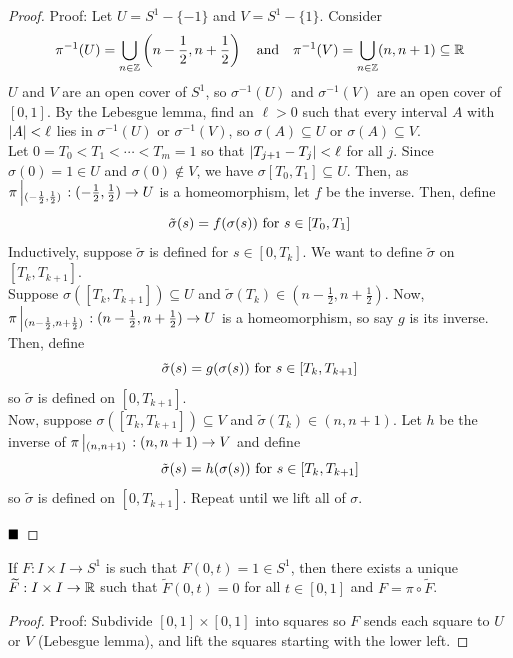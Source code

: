 \begin{proof}{Proof:}
    Let $U = S^1 - \{-1\}$ and $V = S^1 - \{1\}$. Consider
    \[ \pi^{-1}(U) = \bigcup_{n \in \Z} \left(n - \frac{1}{2}, n + \frac{1}{2}\right) \quand \pi^{-1}(V) = \bigcup_{n \in \Z} (n, n + 1) \subseteq \R \]
    $U$ and $V$ are an open cover of $S^1$, so $\sigma^{-1}(U)$ and $\sigma^{-1}(V)$ are an open cover of $[0, 1]$. By the Lebesgue lemma, find an $\ell > 0$ such that every interval $A$ with $\abs{A} < \ell$ lies in $\sigma^{-1}(U)$ or $\sigma^{-1}(V)$, so $\sigma(A) \subseteq U$ or $\sigma(A) \subseteq V$.\\

    Let $0 = T_0 < T_1 < \cdots < T_m = 1$ so that $\abs{T_{j + 1} - T_j} < \ell$ for all $j$. Since $\sigma(0) = 1 \in U$ and $\sigma(0) \notin V$, we have $\sigma[T_0, T_1] \subseteq U$. Then, as $\pi\res{(-\frac{1}{2}, \frac{1}{2})} : (-\frac{1}{2}, \frac{1}{2}) \to U$ is a homeomorphism, let $f$ be the inverse. Then, define
    \[ \tilde{\sigma}(s) = f(\sigma(s)) \tt{ for } s \in [T_0, T_1] \]
    Inductively, suppose $\tilde{\sigma}$ is defined for $s \in [0, T_k]$. We want to define $\tilde{\sigma}$ on $[T_k, T_{k + 1}]$.\\

    Suppose $\sigma([T_k, T_{k + 1}]) \subseteq U$ and $\tilde{\sigma}(T_k) \in (n - \frac{1}{2}, n + \frac{1}{2})$. Now, $\pi\res{(n - \frac{1}{2}, n + \frac{1}{2})} : (n - \frac{1}{2}, n + \frac{1}{2}) \to U$ is a homeomorphism, so say $g$ is its inverse. Then, define
    \[ \tilde{\sigma}(s) = g(\sigma(s)) \tt{ for } s \in [T_k, T_{k + 1}] \]
    so $\tilde{\sigma}$ is defined on $[0, T_{k + 1}]$.\\

    Now, suppose $\sigma([T_k, T_{k + 1}]) \subseteq V$ and $\tilde{\sigma}(T_k) \in (n, n + 1)$. Let $h$ be the inverse of $\pi\res{(n, n + 1)} : (n, n + 1) \to V$ and define
    \[ \tilde{\sigma}(s) = h(\sigma(s)) \tt{ for } s \in [T_k, T_{k + 1}] \]
    so $\tilde{\sigma}$ is defined on $[0, T_{k + 1}]$. Repeat until we lift all of $\sigma$.

    $\qed$
\end{proof}

\begin{lemma}
    If $F : I \times I \to S^1$ is such that $F(0, t) = 1 \in S^1$, then there exists a unique $\widetilde{F} : I \times I \to \R$ such that $\widetilde{F}(0, t) = 0$ for all $t \in [0, 1]$ and $F = \pi \circ \widetilde{F}$.
\end{lemma}
\begin{proof}{Proof:}
    Subdivide $[0, 1] \times [0, 1]$ into squares so $F$ sends each square to $U$ or $V$ (Lebesgue lemma), and lift the squares starting with the lower left.
\end{proof}

